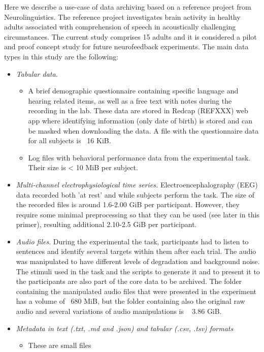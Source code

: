 \documentclass[a4paper,11pt]{report}\usepackage[]{graphicx}\usepackage[dvipsnames]{xcolor}
\begin{document}
Here we describe a use-case of data archiving based on a reference project from Neurolinguistics.  The reference project investigates brain activity in healthy adults associated with comprehension of speech in acoustically challenging circumstances. The current study comprises 15 adults and it is considered a pilot and proof concept study for future neurofeedback experiments. The main data types in this study are the following: 

\begin{itemize}
    \item \textit{Tabular data.} 
    \begin{itemize}
    \item A  brief demographic questionnaire containing specific language and hearing related items, as well as a free text with notes during the recording in the lab. These data are stored in Redcap (REFXXX) web app where identifying information (only date of birth)  is stored and can be masked when downloading the data. A file with the questionnaire data for all subjects is ~16 KiB. 

    \item Log files with behavioral performance data from the  experimental task. Their size is < 10 MiB per subject. 
    \end{itemize}
    
    \item \textit{Multi-channel electrophysiological time series. }Electroencephalography (EEG) data recorded both 'at rest' and while subjects perform the task. The size of the recorded files is around 1.6-2.00 GiB per participant. However, they require some minimal preprocessing so that they can be used (see later in this primer), resulting additional 2.10-2.5 GiB per participant. 
    
    \item \textit{Audio files}. During the experimental the task, participants had to listen to sentences and identify several targets within them after each trial. The audio was manipulated to have different levels of degradation and background noise. The stimuli used in the task and the scripts to generate it and to present it to the participants are also part of the core data to be archived. The folder containing the manipulated audio files that were presented in the experiment has a volume of ~680 MiB, but the folder containing also the original raw audio and several variations of audio manipulations is ~ 3.86 GiB.  

    \item \textit{Metadata in text (.txt, .md and .json) and tabular (.csv, .tsv) formats } 
    \begin{itemize}
    \item These are small files 
    \end{itemize}
\end{itemize}
\end{document}
